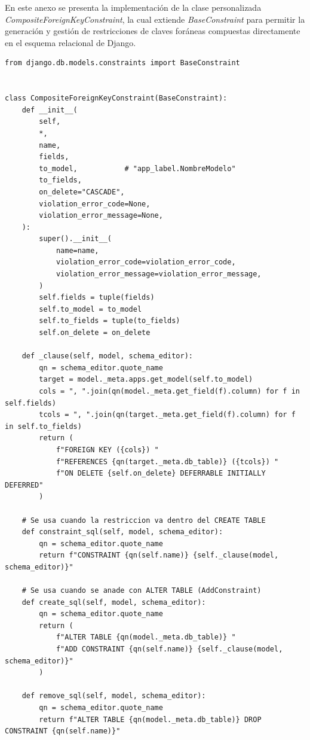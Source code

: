 En este anexo se presenta la implementación de la clase personalizada \textit{CompositeForeignKeyConstraint}, la cual extiende \textit{BaseConstraint} para permitir la generación y gestión de restricciones de claves foráneas compuestas directamente en el esquema relacional de Django.

\begin{lstlisting}[caption={Implementación de CompositeForeignKeyConstraint para claves foráneas compuestas}, label={anx:code-idiom-constraints}]
from django.db.models.constraints import BaseConstraint


class CompositeForeignKeyConstraint(BaseConstraint):
    def __init__(
        self,
        *,
        name,
        fields,
        to_model,           # "app_label.NombreModelo"
        to_fields,
        on_delete="CASCADE",
        violation_error_code=None,
        violation_error_message=None,
    ):
        super().__init__(
            name=name,
            violation_error_code=violation_error_code,
            violation_error_message=violation_error_message,
        )
        self.fields = tuple(fields)
        self.to_model = to_model
        self.to_fields = tuple(to_fields)
        self.on_delete = on_delete

    def _clause(self, model, schema_editor):
        qn = schema_editor.quote_name
        target = model._meta.apps.get_model(self.to_model)
        cols = ", ".join(qn(model._meta.get_field(f).column) for f in self.fields)
        tcols = ", ".join(qn(target._meta.get_field(f).column) for f in self.to_fields)
        return (
            f"FOREIGN KEY ({cols}) "
            f"REFERENCES {qn(target._meta.db_table)} ({tcols}) "
            f"ON DELETE {self.on_delete} DEFERRABLE INITIALLY DEFERRED"
        )

    # Se usa cuando la restriccion va dentro del CREATE TABLE
    def constraint_sql(self, model, schema_editor):
        qn = schema_editor.quote_name
        return f"CONSTRAINT {qn(self.name)} {self._clause(model, schema_editor)}"

    # Se usa cuando se anade con ALTER TABLE (AddConstraint)
    def create_sql(self, model, schema_editor):
        qn = schema_editor.quote_name
        return (
            f"ALTER TABLE {qn(model._meta.db_table)} "
            f"ADD CONSTRAINT {qn(self.name)} {self._clause(model, schema_editor)}"
        )

    def remove_sql(self, model, schema_editor):
        qn = schema_editor.quote_name
        return f"ALTER TABLE {qn(model._meta.db_table)} DROP CONSTRAINT {qn(self.name)}"


\end{lstlisting}
